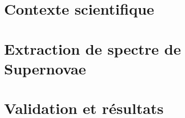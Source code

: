 \documentclass[a4paper, 12pt, final, garamond]{book}
\begin{document}
    
    
    
    
    \cleardoublepage
    \dominitoc
    \tableofcontents
    \listoffigures
    \listoftables
    
    \part{Contexte scientifique}
    
    
    
    
    \part{Extraction de spectre de Supernovae}
    
    
    
    
    \part{Validation et résultats}
    
    
    
    
    
\end{document}
